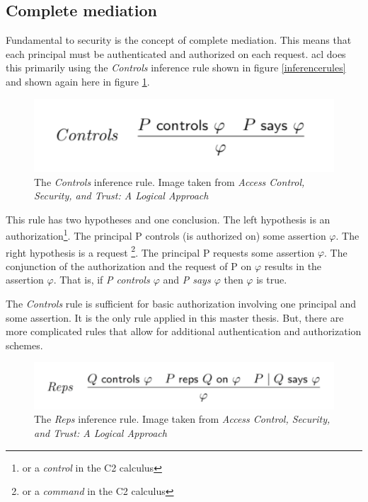 \documentclass[../../main/main.tex]{subfiles}
\begin{document}
\subsection{Complete mediation}\label{ssec:aclcompletemediation}
Fundamental to security is the concept of complete mediation.  This means that each principal must be authenticated and authorized on each request.   \gls{acl} does this primarily using the \textit{Controls} inference rule shown in figure \ref{inferencerules} and shown again here in figure \ref{ControlsInferenceRule}. 

\begin{figure}[h]
\centering
\includegraphics{../figures/ControlsInferenceRule}
\caption{\label{ControlsInferenceRule}The \textit{Controls} inference rule. Image taken from \textit{Access Control, Security, and Trust: A Logical Approach}\cite{ChinOlder}}
\end{figure}

This rule has two hypotheses and one conclusion. The left hypothesis is an authorization\footnote{or a \textit{control} in the C2 calculus}.  The principal P controls (is authorized on) some assertion $\varphi$. The right hypothesis is a request \footnote{or a \textit{command} in the C2 calculus}.  The principal P requests some assertion $\varphi$. The conjunction of the authorization and the request of P on $\varphi$ results in the assertion $\varphi$.  That is, if \textit{P controls $\varphi$} and\textit{ P says $\varphi$} then $\varphi$  is true.  

The \textit{Controls} rule is sufficient for basic authorization involving one principal and some assertion.  It is the only rule applied in this master thesis.  But, there are more complicated rules that allow for additional authentication and authorization schemes.  

\begin{figure}[h]
\centering
\includegraphics[width =0.7 \textwidth]{../figures/repsrule}
\caption{\label{repsrule}The \textit{Reps} inference rule. Image taken from \textit{Access Control, Security, and Trust: A Logical Approach}\cite{ChinOlder}}
\end{figure}
\end{document}
